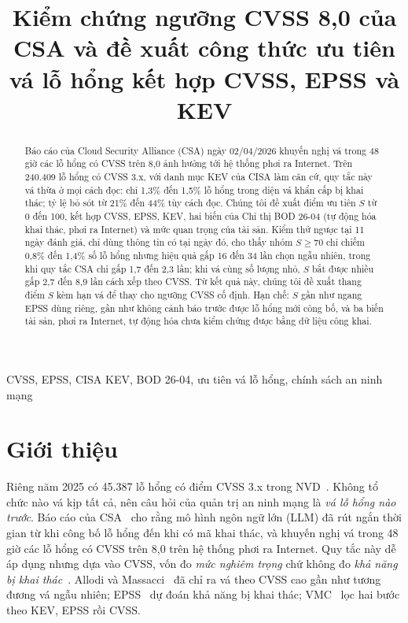 \documentclass[conference]{IEEEtran}
\begin{document}
\title{Kiểm chứng ngưỡng CVSS 8,0 của CSA và đề xuất công thức ưu tiên vá lỗ hổng kết hợp CVSS, EPSS và KEV}

\author{
}

\maketitle

\begin{abstract}
Báo cáo của Cloud Security Alliance (CSA) ngày 02/04/2026 khuyến nghị vá trong 48 giờ các lỗ hổng có CVSS trên
8,0 ảnh hưởng tới hệ thống phơi ra Internet. Trên 240.409 lỗ hổng có CVSS 3.x, với danh mục KEV của CISA làm căn
cứ, quy tắc này vá thừa ở mọi cách đọc: chỉ 1,3\% đến 1,5\% lỗ hổng trong diện vá khẩn cấp bị khai thác; tỷ lệ bỏ
sót từ 21\% đến 44\% tùy cách đọc. Chúng tôi đề xuất điểm ưu tiên $S$ từ 0 đến 100, kết hợp CVSS, EPSS, KEV, hai
biến của Chỉ thị BOD 26-04 (tự động hóa khai thác, phơi ra Internet) và mức quan trọng của tài sản. Kiểm thử ngược
tại 11 ngày đánh giá, chỉ dùng thông tin có tại ngày đó, cho thấy nhóm $S \ge 70$ chỉ chiếm 0,8\% đến 1,4\% số lỗ
hổng nhưng hiệu quả gấp 16 đến 34 lần chọn ngẫu nhiên, trong khi quy tắc CSA chỉ gấp 1,7 đến 2,3 lần; khi vá cùng
số lượng nhỏ, $S$ bắt được nhiều gấp 2,7 đến 8,9 lần cách xếp theo CVSS. Từ kết quả này, chúng tôi đề xuất thang
điểm $S$ kèm hạn vá để thay cho ngưỡng CVSS cố định. Hạn chế: $S$ gần như ngang EPSS dùng riêng, gần như không cảnh
báo trước được lỗ hổng mới công bố, và ba biến tài sản, phơi ra Internet, tự động hóa chưa kiểm chứng được bằng dữ
liệu công khai.
\end{abstract}

\begin{IEEEkeywords}
CVSS, EPSS, CISA KEV, BOD 26-04, ưu tiên vá lỗ hổng, chính sách an ninh mạng
\end{IEEEkeywords}

\section{Giới thiệu}

Riêng năm 2025 có 45.387 lỗ hổng có điểm CVSS 3.x trong NVD~\cite{nvd}. Không tổ chức nào vá kịp tất cả, nên câu
hỏi của quản trị an ninh mạng là \emph{vá lỗ hổng nào trước}. Báo cáo của CSA~\cite{csa2026} cho rằng mô hình ngôn
ngữ lớn (LLM) đã rút ngắn thời gian từ khi công bố lỗ hổng đến khi có mã khai thác, và khuyến nghị vá trong 48 giờ
các lỗ hổng có CVSS trên 8,0 trên hệ thống phơi ra Internet. Quy tắc này dễ áp dụng nhưng dựa vào CVSS, vốn đo
\emph{mức nghiêm trọng} chứ không đo \emph{khả năng bị khai thác}~\cite{cvss31}. Allodi và Massacci~\cite{allodi2014}
đã chỉ ra vá theo CVSS cao gần như tương đương vá ngẫu nhiên; EPSS~\cite{jacobs2021,epss} dự đoán khả năng bị khai
thác; VMC~\cite{shimizu2026} lọc hai bước theo KEV, EPSS rồi CVSS.
\end{document}

